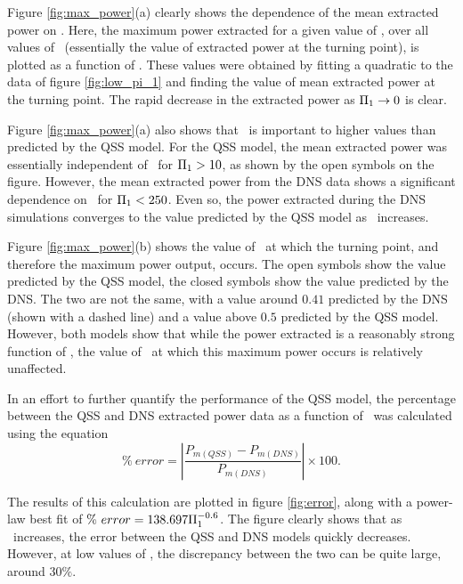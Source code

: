 

Figure \ref{fig:max_power}(a) clearly shows the dependence of the mean extracted power on \massstiff. Here, the maximum power extracted for a given value of \massstiff, over all values of \massdamp\ (essentially the value of extracted power at the turning point), is plotted as a function of \massstiff. These values were obtained by fitting a quadratic to the data of figure \ref{fig:low_pi_1} and finding the value of mean extracted power at the turning point. The rapid decrease in the extracted power as $\Pi_1 \rightarrow 0$ is clear.



Figure \ref{fig:max_power}(a) also shows that \massstiff\ is important to higher values than predicted by the QSS model. For the QSS model, the mean extracted power was essentially independent of \massstiff\ for $\Pi_1>10$, as shown by the open symbols on the figure. However, the mean extracted power from the DNS data shows a significant dependence on \massstiff\ for $\Pi_1<250$. Even so, the power extracted during the DNS simulations converges to the value predicted by the QSS model as \massstiff\ increases.

Figure \ref{fig:max_power}(b) shows the value of \massdamp\ at which the turning point, and therefore the maximum power output, occurs. The open symbols show the value predicted by the QSS model, the closed symbols show the value predicted by the DNS. The two are not the same, with a value around $0.41$ predicted by the DNS (shown with a dashed line) and a value above $0.5$ predicted by the QSS model. However, both models show that while the power extracted is a reasonably strong function of \massstiff, the value of \massdamp\ at which this maximum power occurs is relatively unaffected.

In an effort to further quantify the performance of the QSS model, the percentage between the QSS and DNS extracted power data as a function of \massstiff\ was calculated using the equation
\begin{equation}   \label{eqn:error_calculation} 
\% \ error=\left|{\frac{P_{m(QSS)} - P_{m(DNS)}}{P_{m(DNS)}}}\right| \times 100.
\end{equation}

The results of this calculation are plotted in figure \ref{fig:error}, along with a power-law best fit of $\% \ error = 138.697\Pi_1^{-0.6}$. The figure clearly shows that as \massstiff \ increases, the error between the QSS and DNS models quickly decreases. However, at low values of \massstiff, the discrepancy between the two can be quite large, around $30\%$.


